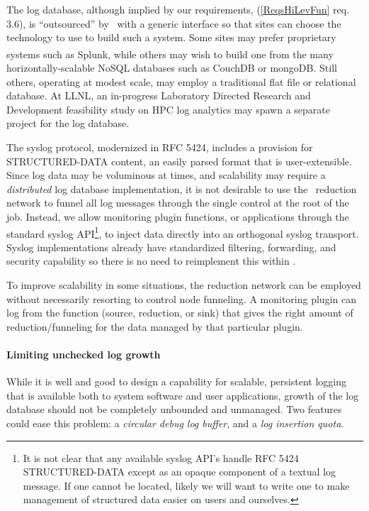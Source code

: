 The log database, although implied by our requirements, 
(\ref{ReqsHiLevFun} req. 3.6), is ``outsourced'' by \ngrm\ with
a generic interface so that sites can choose the technology
to use to build such a system.  Some sites may prefer proprietary
systems such as Splunk\textsuperscript{\textregistered}, while others may
wish to build one from the many horizontally-scalable NoSQL databases
such as CouchDB\cite{CouchDB} or mongoDB\cite{MongoDB}.
Still others, operating at modest scale, may employ a traditional flat
file or relational database.  At LLNL, an in-progress Laboratory
Directed Research and Development feasibility study on HPC log
analytics\cite{LogLDRD} may spawn a separate project for the log database.

The syslog protocol, modernized in RFC 5424\cite{rfc5424},
includes a provision for STRUCTURED-DATA content,
an easily parsed format that is user-extensible.
Since log data may be voluminous at times, and scalability may require
a {\em distributed} log database implementation, it is not desirable to
use the \ngrm\ reduction network to funnel all log messages through the
single control at the root of the job.  Instead, we allow monitoring
plugin functions, or applications through the standard syslog
API\footnote{It is not clear that any available syslog API's handle
RFC 5424 STRUCTURED-DATA except as an opaque component of a textual
log message.  If one cannot be located, likely we will want to write
one to make management of structured data easier on users and ourselves.},
to inject data directly into an orthogonal syslog transport.
Syslog implementations already have standardized filtering, forwarding,
and security capability so there is no need to reimplement this within \ngrm.

To improve scalability in some situations, the reduction network can be
employed without necessarily resorting to control node funneling.
A monitoring plugin can log from the function (source, reduction, or sink)
that gives the right amount of reduction/funneling for the data managed
by that particular plugin.

\paragraph{Limiting unchecked log growth}
While it is well and good to design a capability for scalable, persistent
logging that is available both to system software and user applications,
growth of the log database should not be completely unbounded and unmanaged.
Two features could ease this problem: a {\em circular debug log buffer}, and
a {\em log insertion quota}.

